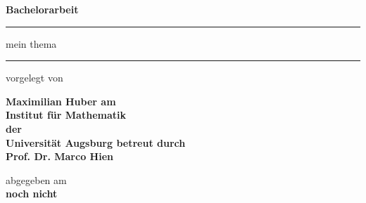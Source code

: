 \begin{titlepage}
  \thispagestyle{empty}
  \newcommand{\Rule}{\rule{\textwidth}{1mm}}
  \begin{center}\sffamily\bfseries
    \LARGE Bachelorarbeit
    \vfill
    \Rule\vspace{5mm}
    \Huge
    mein thema
    \vspace{1mm}\Rule
    \vfill
    \normalfont\sffamily\large vorgelegt von\par
    \bfseries\LARGE Maximilian Huber
    \vfill
    \normalfont\sffamily\large am\\
    \bfseries\Large Institut für Mathematik\\
    \normalfont\sffamily\large der\\
    \bfseries\Large Universität Augsburg
    \vfill
    \normalfont\sffamily\large betreut durch \\
    \bfseries\Large Prof. Dr. Marco Hien \par
    \vfill
    \normalfont\sffamily\large abgegeben am \\
    \bfseries\Large noch nicht\\
  \end{center}
\begin{comment}
  \begin{center}
    stand: \today
  \end{center}
\end{comment}
\end{titlepage}
